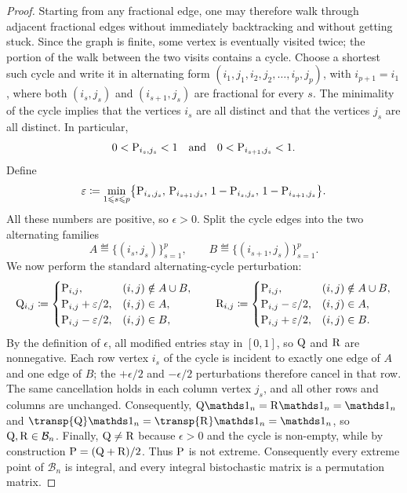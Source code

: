 \begin{proof}
	Starting from any fractional edge, one may therefore walk through adjacent fractional edges without immediately backtracking and without getting stuck. Since the graph is finite, some vertex is eventually visited twice; the portion of the walk between the two visits contains a cycle. Choose a shortest such cycle and write it in alternating form $(i_1,j_1,i_2,j_2,\ldots,i_p,j_p)$, with $i_{p+1}=i_1$, where both $(i_s,j_s)$ and $(i_{s+1},j_s)$ are fractional for every $s$. The minimality of the cycle implies that the vertices $i_s$ are all distinct and that the vertices $j_s$ are all distinct. In particular,
	\[
		0<\P_{i_s,j_s}<1
		\qandq
		0<\P_{i_{s+1},j_s}<1.
	\]
	Define
	\[
		\epsilon
		\eqdef
		\min_{1\leq s\leq p}
		\bigl\{
		\P_{i_s,j_s},\,
		\P_{i_{s+1},j_s},\,
		1-\P_{i_s,j_s},\,
		1-\P_{i_{s+1},j_s}
		\bigr\}.
	\]
	All these numbers are positive, so $\epsilon>0$. Split the cycle edges into the two alternating families
	\[
		A\eqdef \{(i_s,j_s)\}_{s=1}^p,
		\qquad
		B\eqdef \{(i_{s+1},j_s)\}_{s=1}^p.
	\]
	We now perform the standard alternating-cycle perturbation:
	\[
		\Q_{i,j}\eqdef
		\begin{cases}
			\P_{i,j}, & (i,j)\notin A\cup B,\\
			\P_{i,j}+\epsilon/2, & (i,j)\in A,\\
			\P_{i,j}-\epsilon/2, & (i,j)\in B,
		\end{cases}
		\qquad
		\R_{i,j}\eqdef
		\begin{cases}
			\P_{i,j}, & (i,j)\notin A\cup B,\\
			\P_{i,j}-\epsilon/2, & (i,j)\in A,\\
			\P_{i,j}+\epsilon/2, & (i,j)\in B.
		\end{cases}
	\]
	By the definition of $\epsilon$, all modified entries stay in $[0,1]$, so $\Q$ and $\R$ are nonnegative. Each row vertex $i_s$ of the cycle is incident to exactly one edge of $A$ and one edge of $B$; the $+\epsilon/2$ and $-\epsilon/2$ perturbations therefore cancel in that row. The same cancellation holds in each column vertex $j_s$, and all other rows and columns are unchanged. Consequently, $\Q\ones_n=\R\ones_n=\ones_n$ and $\transp{\Q}\ones_n=\transp{\R}\ones_n=\ones_n$, so $\Q,\R\in\mathcal B_n$. Finally, $\Q\neq \R$ because $\epsilon>0$ and the cycle is non-empty, while by construction $\P=(\Q+\R)/2$. Thus $\P$ is not extreme. Consequently every extreme point of $\mathcal B_n$ is integral, and every integral bistochastic matrix is a permutation matrix.
\end{proof}

